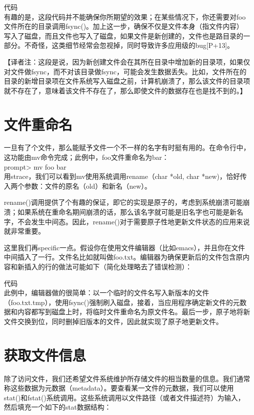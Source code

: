 代码\\

有趣的是，这段代码并不能确保你所期望的效果；在某些情况下，你还需要对foo文件所在的目录调用fsync()。加上这一步，确保不仅是文件本身（指文件内容）写入了磁盘，而且文件也写入了磁盘，如果文件是新创建的，文件也是路目录的一部分。不奇怪，这类细节经常会忽视掉，同时导致许多应用级的bug[P+13]。

【译者注：这段是说，因为新创建文件会在其所在目录中增加新的目录项，如果仅对文件做fsync，而不对该目录做fsync，可能会发生数据丢失。比如，文件所在的目录的新增目录项在文件系统写入磁盘之前，计算机崩溃了，那么该文件的目录项就不存在了，意味着该文件不存在了，那么即使文件的数据存在也是找不到的。】

\section{文件重命名}

一旦有了个文件，那么能赋予文件一个不一样的名字有时挺有用的。在命令行中，这功能由mv命令完成；此例中，foo文件重命名为bar：\\
prompt> mv foo bar\\

用strace，我们可以看到mv使用系统调用rename（char *old, char *new)，恰好传入两个参数：文件的原名（old）和新名（new）。

rename()调用提供了个有趣的保证，即它的实现是原子的，考虑到系统崩溃可能崩溃；如果系统在重命名期间崩溃的话，那么该名字就可能是旧名字也可能是新名字，不会发生中间态。因此，rename()对于需要原子性地更新文件状态的应用来说就非常重要。

这里我们再specific一点。假设你在使用文件编辑器（比如emacs），并且你在文件中间插入了一行。文件名比如就叫做foo.txt。编辑器为确保更新后的文件包含原内容和新插入的行的做法可能如下（简化处理略去了错误检测）：

代码\\

此例中，编辑器做的很简单：以一个临时的文件名写入新版本的文件（foo.txt.tmp），使用fsync()强制刷入磁盘，接着，当应用程序确定新文件的元数据和内容都写到磁盘上时，将临时文件重命名为原文件名。最后一步，原子地将新文件交换到位，同时删掉旧版本的文件，因此就实现了原子地更新文件。

\section{获取文件信息}

除了访问文件，我们还希望文件系统维护所存储文件的相当数量的信息。我们通常称这些数据为元数据（metadata）。要查看某一文件的元数据，我们可以使用stat()和fstat()系统调用。这些系统调用以文件路径（或者文件描述符）为输入，然后填充一个如下的stat数据结构：

